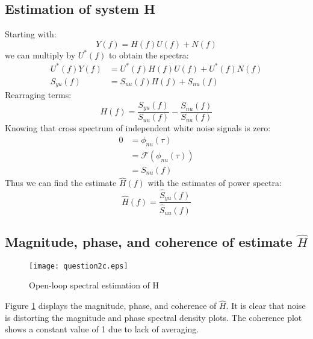 \documentclass[11pt,a4paper]{article}
\begin{document}
\subsection{Estimation of system H}
Starting with:
\begin{equation*}
    Y(f) = H(f)U(f) + N(f)
\end{equation*}
we can multiply by $U^*(f)$ to obtain the spectra:
\begin{align*}
    U^*(f)Y(f) &= U^*(f)H(f)U(f) + U^*(f)N(f) \\
    S_{yu}(f) &= S_{uu}(f)H(f) + S_{nu}(f)
\end{align*}
Rearraging terms:
\begin{equation}
    H(f) = \frac{S_{yu}(f)}{S_{uu}(f)}  - \frac{S_{nu}(f)}{S_{uu}(f)}
    \label{eq:H}
\end{equation}
Knowing that cross spectrum of independent white noise signals is zero:
\begin{align*}
    0 &= \phi_{nu}(\tau) \\
      &= \mathcal{F}(\phi_{nu}(\tau)) \\
      &= S_{nu}(f)
\end{align*}
Thus we can find the estimate $\hat{H}(f)$ with the estimates of power spectra:
\begin{equation}
    \hat{H}(f) = \frac{\hat{S}_{yu}(f)}{\hat{S}_{uu}(f)}
    \label{eq:H_est}
\end{equation}


\subsection{Magnitude, phase, and coherence of estimate $\hat{H}$}
\begin{figure}
    \begin{center}
        \texttt{[image: question2c.eps]}
    \end{center}
    \caption{Open-loop spectral estimation of H}
    \label{fig:2c}
\end{figure}
Figure \ref{fig:2c} displays the magnitude, phase, and coherence of $\hat{H}$.
It is clear that noise is distorting the magnitude and phase spectral density
plots. The coherence plot shows a constant value of 1 due to lack of averaging.

\end{document}
